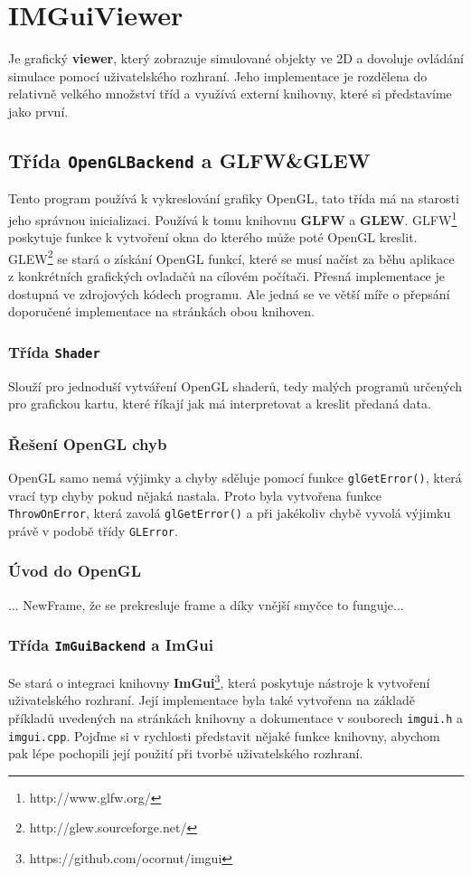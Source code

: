 \chapter{IMGuiViewer}
Je grafický \textbf{viewer}, který zobrazuje simulované objekty ve 2D a dovoluje ovládání simulace pomocí uživatelského rozhraní. Jeho implementace je rozdělena do relativně velkého množství tříd a využívá externí knihovny, které si představíme jako první.

\section{Třída \texttt{OpenGLBackend} a GLFW\&GLEW}
Tento program používá k vykreslování grafiky OpenGL, tato třída má na starosti jeho správnou inicializaci. Používá k tomu knihovnu \textbf{GLFW} a \textbf{GLEW}.
GLFW\footnote{http://www.glfw.org/} poskytuje funkce k vytvoření okna do kterého může poté OpenGL kreslit.
GLEW\footnote{http://glew.sourceforge.net/} se stará o získání OpenGL funkcí, které se musí načíst za běhu aplikace z konkrétních grafických ovladačů na cílovém počítači.
Přesná implementace je dostupná ve zdrojových kódech programu. Ale jedná se ve větší míře o přepsání doporučené implementace na stránkách obou knihoven.

\subsection{Třída \texttt{Shader}}
Slouží pro jednoduší vytváření OpenGL shaderů, tedy malých programů určených pro grafickou kartu, které říkají jak má interpretovat a kreslit předaná data.
\subsection{Řešení OpenGL chyb} 
OpenGL samo nemá výjimky a chyby sděluje pomocí funkce \texttt{glGetError()}, která vrací typ chyby pokud nějaká nastala. Proto byla vytvořena funkce \texttt{ThrowOnError}, která zavolá \texttt{glGetError()} a při jakékoliv chybě vyvolá výjimku právě v podobě třídy \texttt{GLError}.
\subsection{Úvod do OpenGL}
... NewFrame, že se prekresluje frame a díky vnější smyčce to funguje...
\subsection{Třída \texttt{ImGuiBackend} a ImGui}
Se stará o integraci knihovny \textbf{ImGui}\footnote{https://github.com/ocornut/imgui}, která poskytuje nástroje k vytvoření uživatelského rozhraní.
Její implementace byla také vytvořena na základě příkladů uvedených na stránkách knihovny a dokumentace v souborech \texttt{imgui.h} a \texttt{imgui.cpp}. 
Pojďme si v rychlosti představit nějaké funkce knihovny, abychom pak lépe pochopili její použití při tvorbě uživatelského rozhraní.

